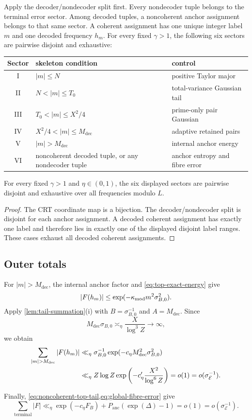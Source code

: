 Apply the decoder/nondecoder split first.  Every nondecoder tuple belongs to the terminal error sector.  Among decoded tuples, a noncoherent anchor assignment belongs to that same sector.  A coherent assignment has one unique integer label $m$ and one decoded frequency $h_m$.  For every fixed $\gamma>1$, the following six sectors are pairwise disjoint and exhaustive:
\begin{center}
\begin{tabular}{@{}c p{5.2cm} p{5.0cm}@{}}
\toprule
Sector & skeleton condition & control \\
\midrule
I & $|m|\leq N$ & positive Taylor major \\
II & $N<|m|\leq T_0$ & total-variance Gaussian tail \\
III & $T_0<|m|\leq X^2/4$ & prime-only pair Gaussian \\
IV & $X^2/4<|m|\leq M_{\mathrm{dec}}$ & adaptive retained pairs \\
V & $|m|>M_{\mathrm{dec}}$ & internal anchor energy \\
VI & noncoherent decoded tuple, or any nondecoder tuple & anchor entropy and fibre error \\
\bottomrule
\end{tabular}
\end{center}

\begin{proposition}
\label{prop:six-sector-exhaustion}
For every fixed $\gamma>1$ and $\eta\in(0,1)$, the six displayed sectors are pairwise disjoint and exhaustive over all frequencies modulo $L$.
\end{proposition}

\begin{proof}
The CRT coordinate map is a bijection.  The decoder/nondecoder split is disjoint for each anchor assignment.  A decoded coherent assignment has exactly one label and therefore lies in exactly one of the displayed disjoint label ranges.  These cases exhaust all decoded coherent assignments.
\end{proof}

\subsection{Outer totals}

For $|m|>M_{\mathrm{dec}}$, the internal anchor factor and \cref{eq:top-exact-energy} give
\[
 |F(h_m)|\leq\exp(-\kappa_{\rm mod}m^2\sigma_{B,0}^2).
\]
Apply \cref{lem:tail-summation}(i) with $B=\sigma_{B,0}^{-1}$ and $A=M_{\mathrm{dec}}$.  Since
\[
 M_{\mathrm{dec}}\sigma_{B,0}
 \asymp_\eta\frac{X}{\log^3Z}\longrightarrow\infty,
\]
we obtain
\begin{align}
 \sum_{|m|>M_{\mathrm{dec}}}|F(h_m)|
 &\ll_\eta\sigma_{B,0}^{-1}
 \exp(-c_\eta M_{\mathrm{dec}}^2\sigma_{B,0}^2)\notag\\
 &\ll_\eta Z\log Z\exp\left(-c'_\eta\frac{X^2}{\log^6Z}\right)
 =o(1)=o(\sigma_{\mathcal E}^{-1}).
 \label{eq:anchor-tail-total}
\end{align}

Finally, \cref{eq:noncoherent-top-tail,eq:global-fibre-error} give
\begin{equation}
\label{eq:terminal-error-total}
 \sum_{\mathrm{terminal}}|F|
 \ll_\eta\exp(-c_\eta F_B)
   +P_{\mathrm{anc}}(\exp(\Delta)-1)
 =o(1)=o(\sigma_{\mathcal E}^{-1}).
\end{equation}
